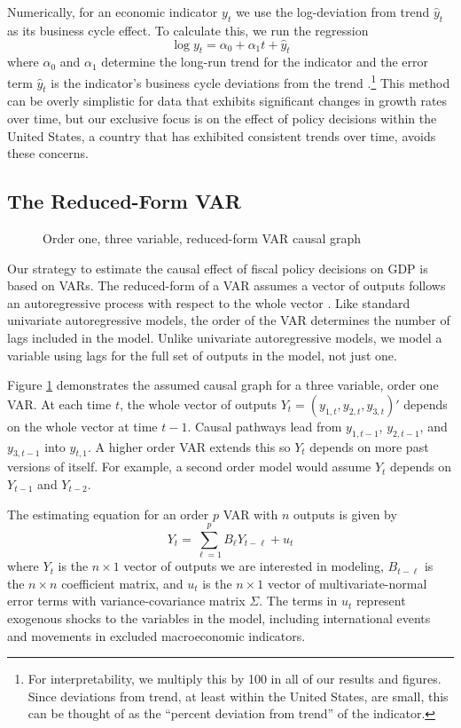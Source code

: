 Numerically, for an economic indicator $y_t$ we use the log-deviation from trend $\hat{y}_t$ as its business cycle effect. To calculate this, we run the regression
\[
    \log y_t = \alpha_0 + \alpha_1 t + \hat{y}_t
\]
where $\alpha_0$ and $\alpha_1$ determine the long-run trend for the indicator and the error term $\hat{y}_t$ is the indicator's business cycle deviations from the trend \parencite{seip2024scoring}.\footnote{For interpretability, we multiply this by 100 in all of our results and figures. Since deviations from trend, at least within the United States, are small, this can be thought of as the ``percent deviation from trend'' of the indicator.} This method can be overly simplistic for data that exhibits significant changes in growth rates over time, but our exclusive focus is on the effect of policy decisions within the United States, a country that has exhibited consistent trends over time, avoids these concerns.


\subsection{The Reduced-Form VAR}

\begin{figure}[t!]
    \centering
    \caption{Order one, three variable, reduced-form VAR causal graph}
    
    \label{fig:rfvar-graph}
\end{figure}

Our strategy to estimate the causal effect of fiscal policy decisions on GDP is based on VARs. The reduced-form of a VAR assumes a vector of outputs follows an autoregressive process with respect to the whole vector \parencite{neusser2016time}. Like standard univariate autoregressive models, the order of the VAR determines the number of lags included in the model. Unlike univariate autoregressive models, we model a variable using lags for the full set of outputs in the model, not just one.

Figure \ref{fig:rfvar-graph} demonstrates the assumed causal graph for a three variable, order one VAR. At each time $t$, the whole vector of outputs $Y_t = (y_{1, t}, y_{2, t}, y_{3, t})'$ depends on the whole vector at time $t-1$. Causal pathways lead from $y_{1, t-1}$, $y_{2, t-1}$, and $y_{3, t-1}$ into $y_{t,1}$. A higher order VAR extends this so $Y_t$ depends on more past versions of itself. For example, a second order model would assume $Y_t$ depends on $Y_{t-1}$ and $Y_{t-2}$.

The estimating equation for an order $p$ VAR with $n$ outputs is given by
\[
    Y_t = \sum_{\ell = 1}^p B_\ell Y_{t - \ell} + u_t
\]
where $Y_t$ is the $n \times 1$ vector of outputs we are interested in modeling, $B_{t - \ell}$ is the $n \times n$ coefficient matrix, and $u_t$ is the $n \times 1$ vector of multivariate-normal error terms with variance-covariance matrix $\Sigma$. The terms in $u_t$ represent exogenous shocks to the variables in the model, including international events and movements in excluded macroeconomic indicators.


